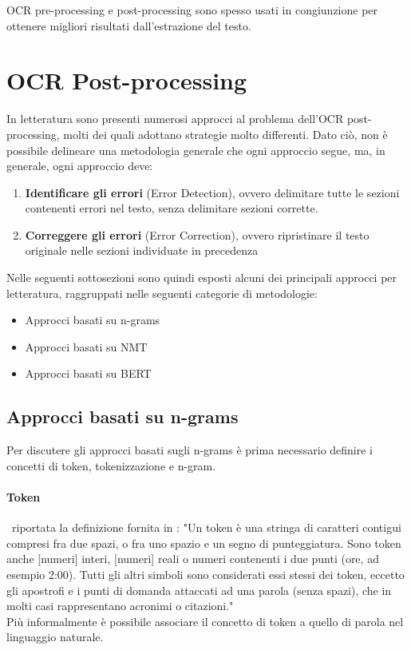 OCR pre-processing e post-processing sono spesso usati in congiunzione per ottenere migliori risultati dall'estrazione del testo.

\section{OCR Post-processing}
\label{sec:art_post_post}
In letteratura sono presenti numerosi approcci al problema dell'OCR post-processing, molti dei quali adottano strategie molto differenti. Dato ciò, non è possibile delineare una metodologia generale che ogni approccio segue, ma, in generale, ogni approccio deve:
\begin{enumerate}
\item \textbf{Identificare gli errori} (Error Detection), ovvero delimitare tutte le sezioni contenenti errori nel testo, senza delimitare sezioni corrette.
\item \textbf{Correggere gli errori} (Error Correction), ovvero ripristinare il testo originale nelle sezioni individuate in precedenza
\end{enumerate}

Nelle seguenti sottosezioni sono quindi esposti alcuni dei principali approcci per letteratura, raggruppati nelle seguenti categorie di metodologie:
\begin{itemize}
\item Approcci basati su n-grams
\item Approcci basati su NMT
\item Approcci basati su BERT
\end{itemize}

\subsection{Approcci basati su n-grams}
Per discutere gli approcci basati sugli n-grams è prima necessario definire i concetti di token, tokenizzazione e n-gram. 

\paragraph{Token}
\E\ riportata la definizione fornita in \cite{tokendef}: "Un token è una stringa di caratteri contigui compresi fra due spazi, o fra uno spazio e un segno di punteggiatura. Sono token anche [numeri] interi, [numeri] reali o numeri contenenti i due punti (ore, ad esempio 2:00). Tutti gli altri simboli sono considerati essi stessi dei token, eccetto gli apostrofi e i punti di domanda attaccati ad una parola (senza spazi), che in molti casi rappresentano acronimi o citazioni."\\
Più informalmente è possibile associare il concetto di token a quello di parola nel linguaggio naturale.


